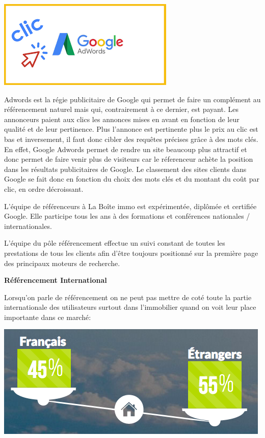 \documentclass[12pt]{article}
\begin{document}
\vspace{0.5cm}

\begin{center} \includegraphics[scale = 0.7]{Adwords.png} \end{center}
\vspace{0.5cm}
Adwords est la régie publicitaire de Google qui permet de faire un complément au référencement naturel mais qui, contrairement à ce dernier,  est payant. Les annonceurs paient aux clics les annonces mises en avant en fonction de leur qualité et de leur pertinence. Plus l'annonce est pertinente plus le prix au clic est bas et inversement, il faut donc cibler des requêtes précises grâce à des mots clés.
En effet, Google Adwords permet de rendre un site beaucoup plus attractif et donc permet de faire venir plus de visiteurs car le réferenceur achète la position dans les résultats publicitaires de Google. Le classement des sites clients dans Google se fait donc en fonction du choix des mots clés et du montant du coût par clic, en ordre décroissant.

L'équipe de référenceurs à La Boîte immo est expérimentée, diplômée et certifiée Google. Elle participe tous les ans à des formations et conférences nationales / internationales.

L'équipe du pôle référencement effectue un suivi constant de toutes les prestations de tous les clients afin d'être toujours positionné sur la première page des principaux moteurs de recherche.

\newpage
\medbreak
\textbf{Référencement International}

Lorsqu'on parle de référencement on ne peut pas mettre de coté toute la partie internationale des utilisateurs surtout dans l'immobilier quand on voit leur place importante dans ce marché:

\vspace{0.5cm}
\begin{center} \includegraphics[scale = 0.5]{balance.png} \end{center}
\vspace{0.5cm}
\end{document}
